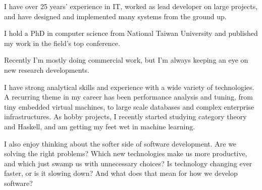 \documentclass[10pt,a4paper]{../altacv}
\begin{document}
	
	\begin{fullwidth}
		\makecvheader
		
		I have over 25 years’ experience in IT, worked as lead developer on large projects, and have designed and implemented many systems from the ground up.
		
		\medskip
		
		I hold a PhD in computer science from National Taiwan University and published my work in the field’s top conference.
		
		\medskip
		
		Recently I'm mostly doing commercial work, but I’m always keeping an eye on new research developments.
		
		\medskip
		
		I have strong analytical skills and experience with a wide variety of technologies. A recurring theme in my career has been performance analysis and tuning, from tiny embedded virtual machines, to large scale databases and complex enterprise infrastructures. As hobby projects, I recently started studying category theory and Haskell, and am getting my feet wet in machine learning.
		
		\medskip
		
		I also enjoy thinking about the softer side of software development. Are we solving the right problems? Which new technologies make us more productive, and which just swamp us with unnecessary choices? Is technology changing ever faster, or is it slowing down? And what does that mean for how we develop software?
		
	\end{fullwidth}
	
	\small
	
	
	
\end{document}
